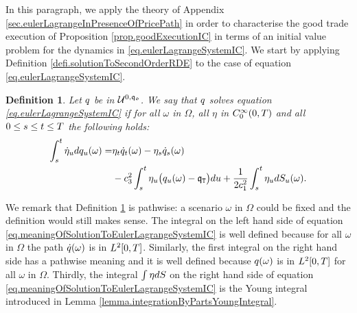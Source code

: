 \documentclass[10pt,a4paper]{article}
\newtheorem{defi}[thm]{Definition}
\begin{document}
	In this  paragraph, we apply the theory of Appendix \ref{sec.eulerLagrangeInPresenceOfPricePath} in order to characterise the good trade execution of Proposition \ref{prop.goodExecutionIC} in terms of an initial value problem for the dynamics in \eqref{eq.eulerLagrangeSystemIC}. We start by applying Definition \ref{defi.solutionToSecondOrderRDE} to the case of equation \eqref{eq.eulerLagrangeSystemIC}.
	\begin{defi}\label{defi.meaningOfSolutionToEulerLagrangeSystemIC}
		Let $q$ be in $\mathcal{U}^{0,\mathfrak{q_0}}$. We say that $q$ solves equation \eqref{eq.eulerLagrangeSystemIC} if for all $\omega$ in $\Omega$, all $\eta$ in $C^{\infty}_{0} (0,T)$ and all $0\leq s\leq t \leq T$ the following holds:
		\begin{equation}
		\label{eq.meaningOfSolutionToEulerLagrangeSystemIC}
		\begin{split}
		\int_{s}^{t} \dot{\eta}_u dq_u (\omega) 
		=& \eta_t \dot{q}_{t}(\omega) - \eta_s \dot{q}_s (\omega) \\
		& - c_{3}^{2} 	\int_{s}^{t} \eta_u \big(q_u (\omega) - \mathfrak{q}_{\mathtt{T} }\big) du 
		+ \frac{1}{2c_{1}^{2}} 	\int_{s}^{t} \eta_{u} dS_u (\omega).
		\end{split}
		\end{equation}
	\end{defi}
	We remark that Definition \ref{defi.meaningOfSolutionToEulerLagrangeSystemIC} is pathwise: a scenario $\omega$ in $\Omega$ could be fixed and the definition would still makes sense. The integral on the left hand side of equation \eqref{eq.meaningOfSolutionToEulerLagrangeSystemIC} is well defined because for all $\omega$ in $\Omega$ the path $\dot{q}(\omega)$ is in $L^{2} {[0,T]}$. Similarly, the first integral on the right hand side has a pathwise meaning and it is well defined because $q(\omega)$ is in $L^{2} {[0,T]}$ for all  $\omega$ in $\Omega$. Thirdly, the integral $\int \eta dS$ on the right hand side of equation \eqref{eq.meaningOfSolutionToEulerLagrangeSystemIC} is the Young integral introduced in Lemma \ref{lemma.integrationByPartsYoungIntegral}.
	
\end{document}
